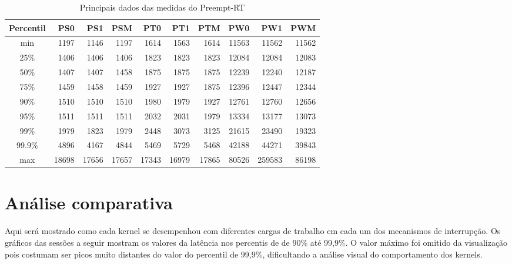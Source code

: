 \begin{table}[h!]
\centering
\begin{center}
\begin{tabular}{|c||r|r|r|r|r|r|r|r|r|}
\toprule
Percentil &    PS0 &    PS1 &    PSM &    PT0 &    PT1 &    PTM &    PW0 &     PW1 &    PWM \\
\midrule
    min &   1197 &   1146 &   1197 &   1614 &   1563 &   1614 &  11563 &   11562 &  11562 \\
    25\% &   1406 &   1406 &   1406 &   1823 &   1823 &   1823 &  12084 &   12084 &  12083 \\
    50\% &   1407 &   1407 &   1458 &   1875 &   1875 &   1875 &  12239 &   12240 &  12187 \\
    75\% &   1459 &   1458 &   1459 &   1927 &   1927 &   1875 &  12396 &   12447 &  12344 \\
    90\% &   1510 &   1510 &   1510 &   1980 &   1979 &   1927 &  12761 &   12760 &  12656 \\
    95\% &   1511 &   1511 &   1511 &   2032 &   2031 &   1979 &  13334 &   13177 &  13073 \\
    99\% &   1979 &   1823 &   1979 &   2448 &   3073 &   3125 &  21615 &   23490 &  19323 \\
    99.9\% &   4896 &   4167 &   4844 &   5469 &   5729 &   5468 &  42188 &   44271 &  39843 \\
    max &  18698 &  17656 &  17657 &  17343 &  16979 &  17865 &  80526 &  259583 &  86198 \\
\bottomrule
\end{tabular}
\end{center}
\caption{Principais dados das medidas do Preempt-RT}
\label{table:prt}
\end{table}



\section{Análise comparativa}

Aqui será mostrado como cada kernel se desempenhou com diferentes cargas de trabalho em cada um dos mecanismos de interrupção. Os gráficos das sessões a seguir mostram os valores da latência nos percentis de de 90\% até 99,9\%. O valor máximo foi omitido da visualização pois costumam ser picos muito distantes do valor do percentil de 99,9\%, dificultando a análise visual do comportamento dos kernels.

